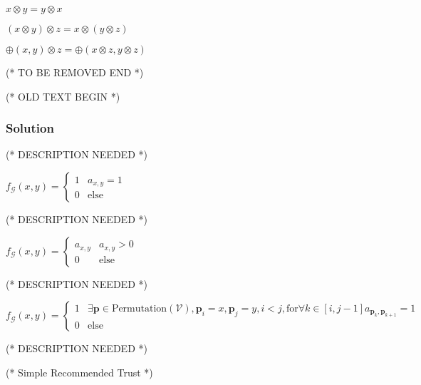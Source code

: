 \documentclass{article}
\begin{document}
\item \(x\otimes y=y\otimes x\)


\item \((x\otimes y)\otimes z=x\otimes (y\otimes z)\)


\item \(\oplus (x,y)\otimes z=\oplus (x\otimes z,y\otimes z)\)



(* TO BE REMOVED END *)



(* OLD TEXT BEGIN *)


\subsubsection{Solution}





(* DESCRIPTION NEEDED *)

\(f_{\mathcal{G}}(x,y)=\begin{cases}
 1 & a_{x,y}=1 \\
 0 & \text{else}
\end{cases}\)





(* DESCRIPTION NEEDED *)

\(f_{\mathcal{G}}(x,y)=\begin{cases}
 a_{x,y} & a_{x,y}>0 \\
 0 & \text{else}
\end{cases}\)





(* DESCRIPTION NEEDED *)

\(f_{\mathcal{G}}(x,y)=\begin{cases}
 1 & \exists \pmb{p}\in \text{Permutation}(\mathcal{V}),\pmb{p}_i=x,\pmb{p}_j=y,i<j,\text{for} \forall k\in [i,j-1] a_{\pmb{p}_k,\pmb{p}_{k+1}}=1
\\
 0 & \text{else}
\end{cases}\)





(* DESCRIPTION NEEDED *)



(* Simple Recommended Trust *)
\end{document}
